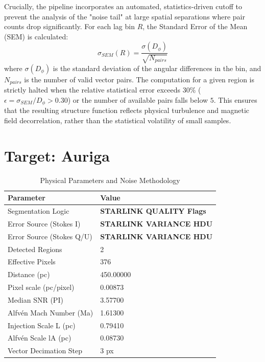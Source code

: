 \documentclass[10pt, a4paper]{article}
\begin{document}
Crucially, the pipeline incorporates an automated, statistics-driven cutoff to prevent the analysis of the "noise tail" at large spatial separations where pair counts drop significantly. For each lag bin $R$, the Standard Error of the Mean (SEM) is calculated:
\begin{equation}
    \sigma_{SEM}(R) = \frac{\sigma(D_\phi)}{\sqrt{N_{pairs}}}
\end{equation}
where $\sigma(D_\phi)$ is the standard deviation of the angular differences in the bin, and $N_{pairs}$ is the number of valid vector pairs. The computation for a given region is strictly halted when the relative statistical error exceeds $30\%$ ($\epsilon = \sigma_{SEM} / D_\phi > 0.30$) or the number of available pairs falls below $5$. This ensures that the resulting structure function reflects physical turbulence and magnetic field decorrelation, rather than the statistical volatility of small samples.\newpage\section*{Target: Auriga}
\begin{table}[H]
    \centering
    \caption*{Physical Parameters and Noise Methodology}
    \begin{tabular}{lp{10cm}}
        \toprule \textbf{Parameter} & \textbf{Value} \\ \midrule
        Segmentation Logic & \textbf{STARLINK QUALITY Flags} \\
        Error Source (Stokes I) & \textbf{STARLINK VARIANCE HDU} \\
        Error Source (Stokes Q/U) & \textbf{STARLINK VARIANCE HDU} \\
        Detected Regions & 2 \\
        Effective Pixels & 376 \\
        Distance (pc) & 450.00000 \\
        Pixel scale (pc/pixel) & 0.00873 \\
        Median SNR (PI) & 3.57700 \\
        Alfvén Mach Number (Ma) & 1.61300 \\
        Injection Scale L (pc) & 0.79410 \\
        Alfvén Scale lA (pc) & 0.08730 \\
        Vector Decimation Step & 3 px \\
        \bottomrule
    \end{tabular}
\end{table}
\end{document}
